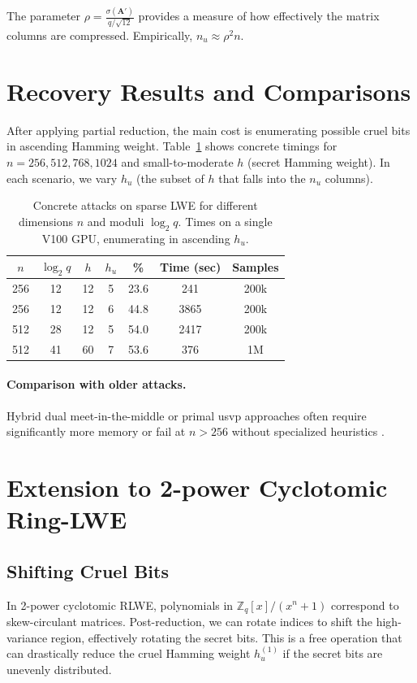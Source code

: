 \documentclass[11pt]{article}
\begin{document}
\noindent
The parameter $\rho = \frac{\sigma(\mathbf{A}')}{q/\sqrt{12}}$ provides a measure of how effectively the matrix columns are compressed. Empirically, $n_u \approx \rho^2 n$.

\section{Recovery Results and Comparisons}
\label{sec:recovery_results}
After applying partial reduction, the main cost is enumerating possible cruel bits in ascending Hamming weight. Table~\ref{tab:attack_times} shows concrete timings for $n = 256, 512, 768, 1024$ and small-to-moderate $h$ (secret Hamming weight). In each scenario, we vary $h_u$ (the subset of $h$ that falls into the $n_u$ columns).

\begin{table}[ht]
\centering
\caption{Concrete attacks on sparse LWE for different dimensions $n$ and moduli $\log_2 q$. Times on a single V100 GPU, enumerating in ascending $h_u$.}
\label{tab:attack_times}
\begin{tabular}{ccccccc}
\toprule
$n$ & $\log_2 q$ & $h$ & $h_u$ & \% & \textbf{Time (sec)} & \textbf{Samples} \\
\midrule
256 & 12 & 12 & 5 & 23.6 & 241 & 200k \\
256 & 12 & 12 & 6 & 44.8 & 3865 & 200k \\
512 & 28 & 12 & 5 & 54.0 & 2417 & 200k \\
512 & 41 & 60 & 7 & 53.6 & 376 & 1M \\
\bottomrule
\end{tabular}
\end{table}

\paragraph{Comparison with older attacks.}
Hybrid dual meet-in-the-middle or primal usvp approaches often require significantly more memory or fail at $n>256$ without specialized heuristics \cite{ref_mitm,ref_smalln}.

\section{Extension to 2-power Cyclotomic Ring-LWE}
\label{sec:rlwe_extension}
\subsection{Shifting Cruel Bits}
In 2-power cyclotomic RLWE, polynomials in $\mathbb{Z}_q[x]/(x^n + 1)$ correspond to skew-circulant matrices. Post-reduction, we can rotate indices to shift the high-variance region, effectively rotating the secret bits. This is a free operation that can drastically reduce the cruel Hamming weight $h_u^{(1)}$ if the secret bits are unevenly distributed.
\end{document}
